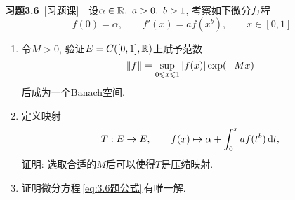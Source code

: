     \textbf{习题3.6}\ [习题课]\ \ 设$ \alpha\in\mathbb{R},\ a>0,\ b>1 $, 考察如下微分方程
    \begin{equation}\label{eq:3.6题公式}
    f(0)=\alpha,\qquad f'(x)=af(x^b),\qquad x\in[0,1]
    \end{equation}
    \begin{enumerate}[(1)]
    \item 令$ M>0 $, 验证$ E=C([0,1],\mathbb{R}) $上赋予范数
    \[
    \left\| f \right\|=\sup_{0\leqslant x\leqslant 1}\left| f(x) \right| \exp(-Mx)
    \]
    后成为一个Banach空间.
    \item 定义映射
    \[
    T : E\to E,\qquad f(x)\mapsto\alpha+\int_0^x af(t^b)\,\mathrm{d} t,
    \]
    证明: 选取合适的$ M $后可以使得$ T $是压缩映射.
    \item 证明微分方程\,\eqref{eq:3.6题公式}\,有唯一解.
    \end{enumerate}
